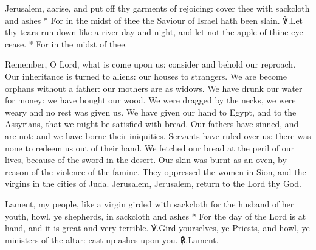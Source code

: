 \documentclass[12pt]{book}
\begin{document}
\begin{enpars}
Jerusalem, aarise, and put off thy garments of rejoicing: cover thee with sackcloth and ashes
* For in the midst of thee the Saviour of Israel hath been slain.
℣.\@  Let thy tears run down like a river day and night, and let not the apple of thine eye cease.
*  For in the midst of thee.
\end{enpars}

\begin{enpars}
Remember, O Lord, what is come upon us: consider and behold our reproach. Our inheritance is turned to aliens: our houses to strangers. We are become orphans without a father: our mothers are as widows.
We have drunk our water for money: we have bought our wood.
We were dragged by the necks, we were weary and no rest was given us.
We have given our hand to Egypt, and to the Assyrians, that we might be satisfied with bread.
Our fathers have sinned, and are not: and we have borne their iniquities.
Servants have ruled over us: there was none to redeem us out of their hand.
We fetched our bread at the peril of our lives, because of the sword in the desert.
Our skin was burnt as an oven, by reason of the violence of the famine.
They oppressed the women in Sion, and the virgins in the cities of Juda.
Jerusalem, Jerusalem, return to the Lord thy God.
\end{enpars}

\orrubrique



\begin{enpars}
Lament, my people, like a virgin girded with sackcloth for the husband of her youth, howl, ye shepherds, in sackcloth and ashes
* For the day of the Lord is at hand, and it is great and very terrible.
℣.\@  Gird yourselves, ye Priests, and howl, ye ministers of the altar: cast up ashes upon you.
℟.\@  Lament.
\end{enpars}



\end{document}
